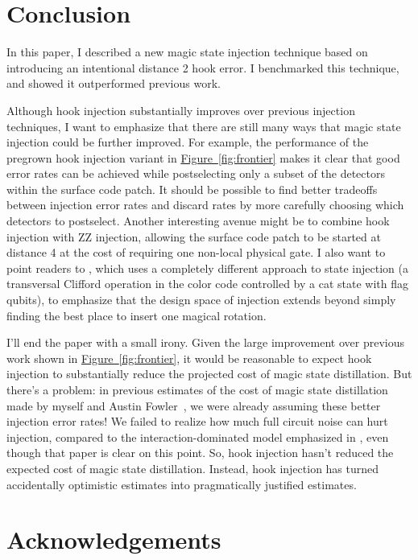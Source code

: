 \documentclass[onecolumn,unpublished,a4paper]{quantumarticle}
\theoremstyle{definition}
\theoremstyle{definition}
\theoremstyle{definition}
\newcommand{\fig}[1]{\hyperref[fig:#1]{Figure~\ref*{fig:#1}}}
\begin{document}
\section{Conclusion}
\label{sec:conclusion}

In this paper, I described a new magic state injection technique based on introducing an intentional distance 2 hook error.
I benchmarked this technique, and showed it outperformed previous work.

Although hook injection substantially improves over previous injection techniques, I want to emphasize that there are still many ways that magic state injection could be further improved.
For example, the performance of the pregrown hook injection variant in \fig{frontier} makes it clear that good error rates can be achieved while postselecting only a subset of the detectors within the surface code patch.
It should be possible to find better tradeoffs between injection error rates and discard rates by more carefully choosing which detectors to postselect.
Another interesting avenue might be to combine hook injection with ZZ injection, allowing the surface code patch to be started at distance 4 at the cost of requiring one non-local physical gate.
I also want to point readers to \cite{chamberland2020inject}, which uses a completely different approach to state injection (a transversal Clifford operation in the color code controlled by a cat state with flag qubits), to emphasize that the design space of injection extends beyond simply finding the best place to insert one magical rotation.

I'll end the paper with a small irony.
Given the large improvement over previous work shown in \fig{frontier}, it would be reasonable to expect hook injection to substantially reduce the projected cost of magic state distillation.
But there's a problem: in previous estimates of the cost of magic state distillation made by myself and Austin Fowler~\cite{fowler2018latticesurgery,gidney2019catalyzeddistillation}, we were already assuming these better injection error rates!
We failed to realize how much full circuit noise can hurt injection, compared to the interaction-dominated model emphasized in \cite{li2015injection}, even though that paper is clear on this point.
So, hook injection hasn't reduced the expected cost of magic state distillation.
Instead, hook injection has turned accidentally optimistic estimates into pragmatically justified estimates.

\section{Acknowledgements}
\end{document}
